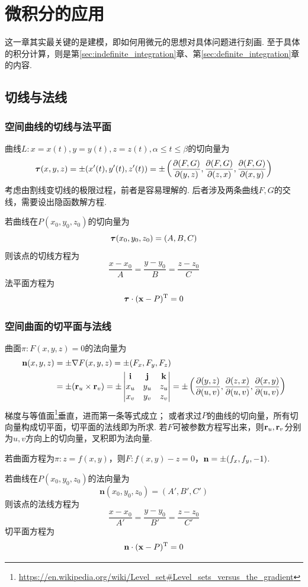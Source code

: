 
\section{微积分的应用}
这一章其实最关键的是建模，即如何用微元的思想对具体问题进行刻画. 至于具体的积分计算，则是第\ref{sec:indefinite_integration}章、第\ref{sec:definite_integration}章的内容.

\subsection{切线与法线}
\subsubsection{空间曲线的切线与法平面}
\label{sub:sub:sec:tangent}
曲线$L:x=x(t),y=y(t),z=z(t),\alpha\leq t\leq\beta$的切向量为
\[\bm{\tau}(x,y,z)=\pm(x'(t),y'(t),z'(t))=\pm\left(\dfrac{\partial (F,G)}{\partial (y,z)},\dfrac{\partial (F,G)}{\partial (z,x)},\dfrac{\partial (F,G)}{\partial (x,y)}\right)\]
考虑由割线变切线的极限过程，前者是容易理解的.
后者涉及两条曲线$F,G$的交线，需要设出隐函数解方程.
\par 若曲线在$P(x_0,y_0,z_0)$的切向量为
\[\bm{\tau}(x_0,y_0,z_0)=(A,B,C)\]
则该点的切线方程为
\[\frac{x-x_0}{A}=\frac{y-y_0}{B}=\frac{z-z_0}{C}\]
法平面方程为
\[\bm{\tau}\cdot(\mathbf{x}-P)^{\mathrm{T}}=0\]

\subsubsection{空间曲面的切平面与法线}
\label{sub:sub:sec:normal}
曲面$\pi:F(x,y,z)=0$的法向量为
\[\begin{aligned}
\mathbf{n}(x,y,z)&=\pm\nabla F(x,y,z)=\pm(F_x,F_y,F_z)\\
&=\pm(\mathbf{r}_u\times\mathbf{r}_v)=\pm\begin{vmatrix}\mathbf{i}&\mathbf{j}&\mathbf{k}\\x_u&y_u&z_u\\x_v&y_v&z_v\end{vmatrix}=\pm\left(\dfrac{\partial (y,z)}{\partial (u,v)},\dfrac{\partial (z,x)}{\partial (u,v)},\dfrac{\partial (x,y)}{\partial (u,v)}\right)
\end{aligned}\]
梯度与等值面\footnote{\url{https://en.wikipedia.org/wiki/Level_set\#Level_sets_versus_the_gradient}}垂直，进而第一条等式成立；
或者求过$P$的曲线的切向量，所有切向量构成切平面，切平面的法线即为所求.
若$F$可被参数方程写出来，则$\mathbf{r}_u,\mathbf{r}_v$分别为$u,v$方向上的切向量，叉积即为法向量.
\par 若曲面方程为$\pi:z=f(x,y)$，则$F:f(x,y)-z=0$，$\mathbf{n}=\pm(f_x,f_y,-1)$.
\par 若曲线在$P(x_0,y_0,z_0)$的法向量为
\[\mathbf{n}(x_0,y_0,z_0)=(A',B',C')\]
则该点的法线方程为
\[\frac{x-x_0}{A'}=\frac{y-y_0}{B'}=\frac{z-z_0}{C'}\]
切平面方程为
\[\mathbf{n}\cdot(\mathbf{x}-P)^{\mathrm{T}}=0\]

